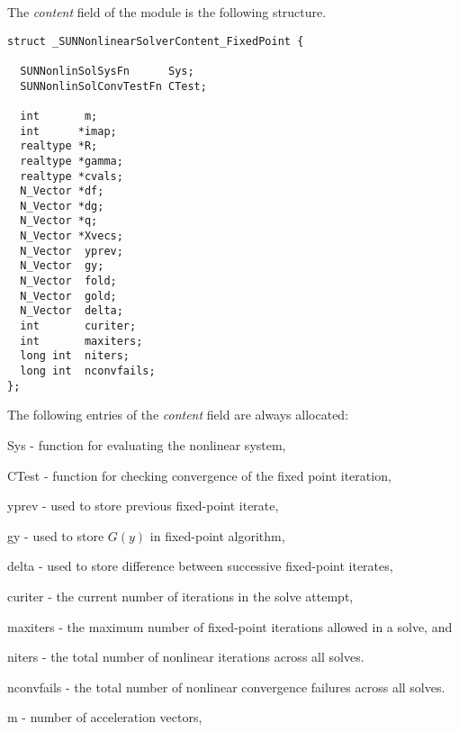 The \textit{content} field of the {\sunnonlinsolfixedpoint} module is the
following structure.
\begin{verbatim}
struct _SUNNonlinearSolverContent_FixedPoint {

  SUNNonlinSolSysFn      Sys;
  SUNNonlinSolConvTestFn CTest;

  int       m;
  int      *imap;
  realtype *R;
  realtype *gamma;
  realtype *cvals;
  N_Vector *df;
  N_Vector *dg;
  N_Vector *q;
  N_Vector *Xvecs;
  N_Vector  yprev;
  N_Vector  gy;
  N_Vector  fold;
  N_Vector  gold;
  N_Vector  delta;
  int       curiter;
  int       maxiters;
  long int  niters;
  long int  nconvfails;
};
\end{verbatim}
The following entries of the \emph{content} field are always
allocated:
\begin{args}[nconvfails]
  \item[Sys]        - function for evaluating the nonlinear system,
  \item[CTest]      - function for checking convergence of the fixed point iteration,
  \item[yprev]      -  used to store previous fixed-point iterate,
  \item[gy]         -  used to store $G(y)$ in fixed-point algorithm,
  \item[delta]      -  used to store difference between successive fixed-point iterates,
  \item[curiter]    - the current number of iterations in the solve attempt,
  \item[maxiters]   - the maximum number of fixed-point iterations allowed in
                      a solve, and
  \item[niters]     - the total number of nonlinear iterations across all
                      solves.
  \item[nconvfails] - the total number of nonlinear convergence failures across
                      all solves.
  \item[m]          - number of acceleration vectors,
\end{args}
\vspace{1em}

